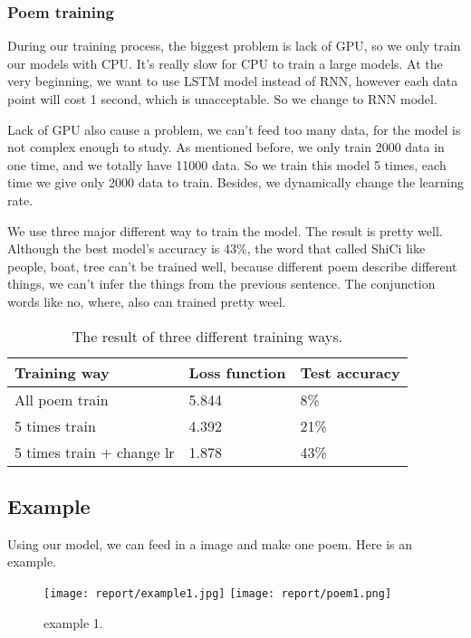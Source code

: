 \documentclass[10pt,twocolumn,letterpaper]{article}
\begin{document}
\subsubsection{Poem training}
During our training process, the biggest problem is lack of GPU, so we only train our models with CPU. It's really slow for CPU to train a large models. At the very beginning, we want to use LSTM model instead of RNN, however each data point will cost 1 second, which is unacceptable. So we change to RNN model.

Lack of GPU also cause a problem, we can't feed too many data, for the model is not complex enough to study. As mentioned before, we only train 2000 data in one time, and we totally have 11000 data. So we train this model 5 times, each time we give only 2000 data to train. Besides, we dynamically change the learning rate.

We use three major different way to train the model. The result is pretty well. Although the best model's accuracy is 43\%, the word that called ShiCi like people, boat, tree can't be trained well, because different poem describe different things, we can't infer the things from the previous sentence. The conjunction words like no, where, also can trained pretty weel.

\begin{table}
\begin{center}
\begin{tabular}{|l|l|l|}
\hline
Training way & Loss function & Test accuracy \\
\hline\hline
All poem train & 5.844 & 8\%\\
5 times train & 4.392 & 21\%\\
5 times train + change lr & 1.878 & 43\%\\
\hline
\end{tabular}
\end{center}
\caption{The result of three different training ways.}
\end{table}

\subsection{Example}
Using our model, we can feed in a image and make one poem. Here is an example.

\begin{figure}[t]
\begin{center}
   \texttt{[image: report/example1.jpg]}
   \texttt{[image: report/poem1.png]}
\end{center}
   \caption{example 1.}
\label{fig:example1}
\end{figure}
\end{document}
